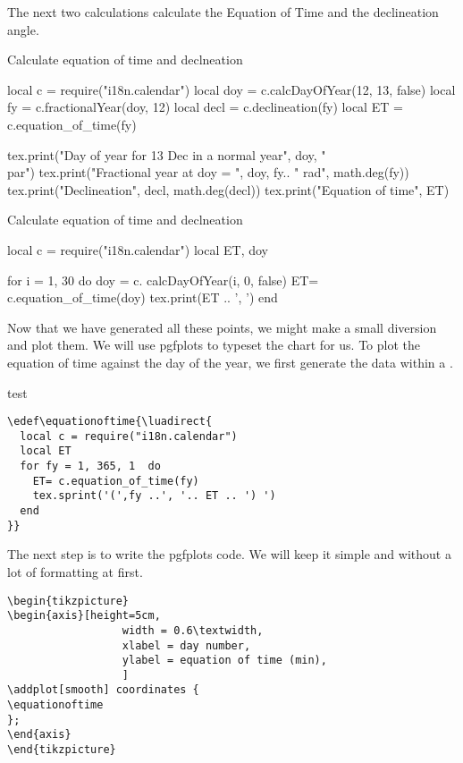 The next two calculations calculate the Equation of Time and the declineation angle.

\begin{texexample}{Calculate equation of time and declneation}{}
\begin{luacode}
local c = require("i18n.calendar") 
local doy = c.calcDayOfYear(12, 13, false)
local fy = c.fractionalYear(doy, 12)
local decl = c.declineation(fy)
local ET   = c.equation_of_time(fy)

tex.print("Day of year for 13 Dec in a normal year", doy, "\\par")
tex.print("Fractional year at doy = ", doy, fy.. " rad", math.deg(fy))
tex.print("Declineation", decl, math.deg(decl))
tex.print("Equation of time", ET)
\end{luacode}
\end{texexample}

\begin{texexample}{Calculate equation of time and declneation}{}
\begin{luacode}
local c = require("i18n.calendar") 
local ET, doy   

for i = 1, 30 do 
    doy = c. calcDayOfYear(i, 0, false)
  ET= c.equation_of_time(doy)
  tex.print(ET .. ', ')
end 
\end{luacode}
\end{texexample}

Now that we have generated all these points, we might make a small diversion and plot them. We will use pgfplots to typeset the chart for us. To plot the equation of time against the day of the year, we first generate the data within a 
\cmd{\luadirect}. 
\bigskip

\begin{scriptexample}{test}{}
\begin{verbatim}
\edef\equationoftime{\luadirect{
  local c = require("i18n.calendar") 
  local ET   
  for fy = 1, 365, 1  do 
    ET= c.equation_of_time(fy)
    tex.sprint('(',fy ..', '.. ET .. ') ')
  end 
}}
\end{verbatim}
\end{scriptexample}
\bigskip

The next step is to write the pgfplots code. We will keep it simple and without a lot of formatting at first.
\edef\equationoftime{\luadirect{
local c = require("i18n.calendar") 
local ET   
for fy = 1, 365, 1  do 
  ET= c.equation_of_time(fy)
  tex.sprint('(',fy ..', '.. ET .. ') ')
end 
}}

\begin{scriptexample}{}{}
\begin{verbatim}
\begin{tikzpicture}
\begin{axis}[height=5cm,
                  width = 0.6\textwidth,
                  xlabel = day number,
                  ylabel = equation of time (min),
                  ]
\addplot[smooth] coordinates {
\equationoftime
};
\end{axis}
\end{tikzpicture}
\end{verbatim}
\end{scriptexample}

